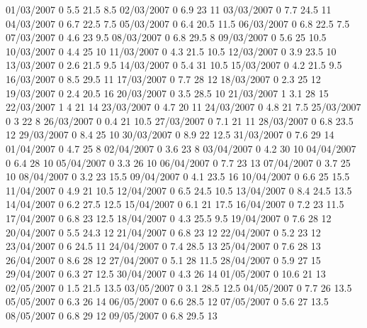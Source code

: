 01/03/2007  0      5.5    21.5   8.5 
02/03/2007  0      6.9    23     11 
03/03/2007  0      7.7    24.5   11 
04/03/2007  0      6.7    22.5   7.5 
05/03/2007  0      6.4    20.5   11.5 
06/03/2007  0      6.8    22.5   7.5 
07/03/2007  0      4.6    23     9.5 
08/03/2007  0      6.8    29.5   8 
09/03/2007  0      5.6    25     10.5 
10/03/2007  0      4.4    25     10 
11/03/2007  0      4.3    21.5   10.5 
12/03/2007  0      3.9    23.5   10 
13/03/2007  0      2.6    21.5   9.5 
14/03/2007  0      5.4    31     10.5 
15/03/2007  0      4.2    21.5   9.5 
16/03/2007  0      8.5    29.5   11 
17/03/2007  0      7.7    28     12 
18/03/2007  0      2.3    25     12 
19/03/2007  0      2.4    20.5   16 
20/03/2007  0      3.5    28.5   10 
21/03/2007  1      3.1    28     15 
22/03/2007  1      4      21     14 
23/03/2007  0      4.7    20     11 
24/03/2007  0      4.8    21     7.5 
25/03/2007  0      3      22     8 
26/03/2007  0      0.4    21     10.5 
27/03/2007  0      7.1    21     11 
28/03/2007  0      6.8    23.5   12 
29/03/2007  0      8.4    25     10 
30/03/2007  0      8.9    22     12.5 
31/03/2007  0      7.6    29     14 
01/04/2007  0      4.7    25     8 
02/04/2007  0      3.6    23     8 
03/04/2007  0      4.2    30     10 
04/04/2007  0      6.4    28     10 
05/04/2007  0      3.3    26     10 
06/04/2007  0      7.7    23     13 
07/04/2007  0      3.7    25     10 
08/04/2007  0      3.2    23     15.5 
09/04/2007  0      4.1    23.5   16 
10/04/2007  0      6.6    25     15.5 
11/04/2007  0      4.9    21     10.5 
12/04/2007  0      6.5    24.5   10.5 
13/04/2007  0      8.4    24.5   13.5 
14/04/2007  0      6.2    27.5   12.5 
15/04/2007  0      6.1    21     17.5 
16/04/2007  0      7.2    23     11.5 
17/04/2007  0      6.8    23     12.5 
18/04/2007  0      4.3    25.5   9.5 
19/04/2007  0      7.6    28     12 
20/04/2007  0      5.5    24.3   12 
21/04/2007  0      6.8    23     12 
22/04/2007  0      5.2    23     12 
23/04/2007  0      6      24.5   11 
24/04/2007  0      7.4    28.5   13 
25/04/2007  0      7.6    28     13 
26/04/2007  0      8.6    28     12 
27/04/2007  0      5.1    28     11.5 
28/04/2007  0      5.9    27     15 
29/04/2007  0      6.3    27     12.5 
30/04/2007  0      4.3    26     14 
01/05/2007  0      10.6   21     13 
02/05/2007  0      1.5    21.5   13.5 
03/05/2007  0      3.1    28.5   12.5 
04/05/2007  0      7.7    26     13.5 
05/05/2007  0      6.3    26     14 
06/05/2007  0      6.6    28.5   12 
07/05/2007  0      5.6    27     13.5 
08/05/2007  0      6.8    29     12 
09/05/2007  0      6.8    29.5   13 
